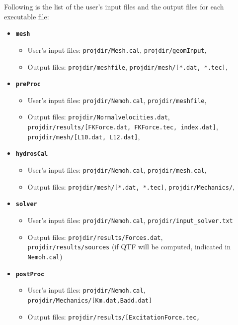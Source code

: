 \documentclass[12pt,a4paper,titlepage]{article}
\begin{document}
Following is the list of the user's input files and the output files for each executable file:
\begin{itemize}
\item \texttt{\textbf{mesh}}
\begin{itemize}
\item User's input files: \texttt{projdir/Mesh.cal}, \texttt{projdir/geomInput}, 
\item Output files: \texttt{projdir/meshfile}, \texttt{projdir/mesh/[*.dat, *.tec]},
\end{itemize}
\item \texttt{\textbf{preProc}}
\begin{itemize}
\item User's input files: \texttt{projdir/Nemoh.cal}, \texttt{projdir/meshfile}, 
\item Output files: \texttt{projdir/Normalvelocities.dat}, \\
  \hspace{2cm} \texttt{projdir/results/[FKForce.dat, FKForce.tec, index.dat]}, \\
  \hspace{2cm} \texttt{projdir/mesh/[L10.dat, L12.dat]},
\end{itemize}
\item \texttt{\textbf{hydrosCal}}
\begin{itemize}
\item User's input files: \texttt{projdir/Nemoh.cal}, \texttt{projdir/mesh.cal},
\item Output files: \texttt{projdir/mesh/[*.dat, *.tec]}, \texttt{projdir/Mechanics/},
\end{itemize}
\item \texttt{\textbf{solver}}
\begin{itemize}
\item User's input files: \texttt{projdir/Nemoh.cal}, \texttt{projdir/input\_solver.txt}  
\item Output files: \texttt{projdir/results/Forces.dat},\\
\texttt{projdir/results/sources} (if QTF will be computed, indicated in \texttt{Nemoh.cal})
\end{itemize}
\item \texttt{\textbf{postProc}}
\begin{itemize}
\item User's input files: \texttt{projdir/Nemoh.cal}, \\ \texttt{projdir/Mechanics/[Km.dat,Badd.dat]}  
\item Output files: \texttt{projdir/results/[ExcitationForce.tec,}\\

\end{itemize}
\end{itemize}
\end{document}
